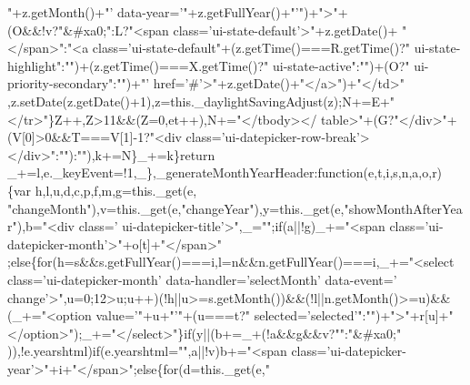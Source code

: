 \begin{DoxyCode}
{      "+z.getMonth()+"'} data-year=\textcolor{stringliteral}{'"+z.getFullYear()+"'}\textcolor{stringliteral}{")+"}>\textcolor{stringliteral}{"+(O&&!v?"}&#xa0;\textcolor{stringliteral}{":L?"}<span \textcolor{keyword}{class}=\textcolor{stringliteral}{'ui-state-default'}>\textcolor{stringliteral}{"+z.getDate()+
      "}</span>\textcolor{stringliteral}{":"}<a \textcolor{keyword}{class}=\textcolor{stringliteral}{'ui-state-default"+(z.getTime()===R.getTime()?"
       ui-state-highlight":"")+(z.getTime()===X.getTime()?" ui-state-active":"")+(O?" ui-priority-secondary":"")+"'} href=\textcolor{charliteral}{'#'}>\textcolor{stringliteral}{"+z.getDate()+"}</a>\textcolor{stringliteral}{")+"}</td>\textcolor{stringliteral}{"
      ,z.setDate(z.getDate()+1),z=this.\_daylightSavingAdjust(z);N+=E+"}</tr>\textcolor{stringliteral}{"\}Z++,Z>11&&(Z=0,et++),N+="}</tbody></
      table>\textcolor{stringliteral}{"+(G?"}</div>\textcolor{stringliteral}{"+(V[0]>0&&T===V[1]-1?"}<div \textcolor{keyword}{class}=\textcolor{stringliteral}{'ui-datepicker-row-break'}></div>\textcolor{stringliteral}{":"}\textcolor{stringliteral}{"):"}\textcolor{stringliteral}{"),k+=N\}\_+=k\}return
       \_+=l,e.\_keyEvent=!1,\_\},\_generateMonthYearHeader:function(e,t,i,s,n,a,o,r)\{var h,l,u,d,c,p,f,m,g=this.\_get(e,
      "}changeMonth\textcolor{stringliteral}{"),v=this.\_get(e,"}changeYear\textcolor{stringliteral}{"),y=this.\_get(e,"}showMonthAfterYear\textcolor{stringliteral}{"),b="}<div \textcolor{keyword}{class}=\textcolor{stringliteral}{'
      ui-datepicker-title'}>\textcolor{stringliteral}{",\_="}\textcolor{stringliteral}{";if(a||!g)\_+="}<span \textcolor{keyword}{class}=\textcolor{stringliteral}{'ui-datepicker-month'}>\textcolor{stringliteral}{"+o[t]+"}</span>\textcolor{stringliteral}{"
      ;else\{for(h=s&&s.getFullYear()===i,l=n&&n.getFullYear()===i,\_+="}<select \textcolor{keyword}{class}=\textcolor{stringliteral}{'ui-datepicker-month'} data-handler=\textcolor{stringliteral}{'selectMonth'} data-\textcolor{keyword}{event}=\textcolor{stringliteral}{'
      change'}>\textcolor{stringliteral}{",u=0;12>u;u++)(!h||u>=s.getMonth())&&(!l||n.getMonth()>=u)&&(\_+="}<option value=\textcolor{stringliteral}{'"+u+"'}\textcolor{stringliteral}{"+(u===t?"} 
      selected=\textcolor{stringliteral}{'selected'}\textcolor{stringliteral}{":"}\textcolor{stringliteral}{")+"}>\textcolor{stringliteral}{"+r[u]+"}</option>\textcolor{stringliteral}{");\_+="}</select>\textcolor{stringliteral}{"\}if(y||(b+=\_+(!a&&g&&v?"}\textcolor{stringliteral}{":"}&#xa0;\textcolor{stringliteral}{"
      )),!e.yearshtml)if(e.yearshtml="}\textcolor{stringliteral}{",a||!v)b+="}<span \textcolor{keyword}{class}=\textcolor{stringliteral}{'ui-datepicker-year'}>\textcolor{stringliteral}{"+i+"}</span>\textcolor{stringliteral}{";else\{for(d=this.\_get(e,"}

\end{DoxyCode}
